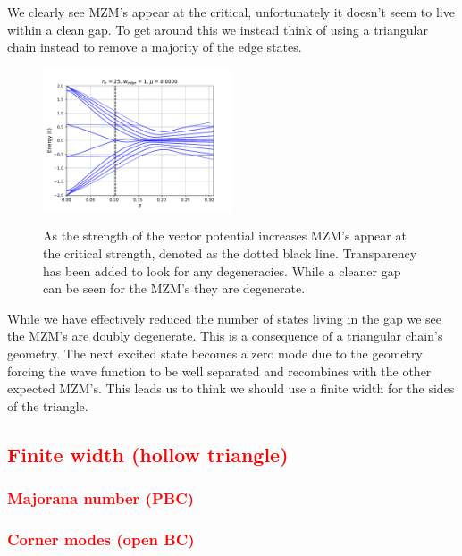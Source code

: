 \documentclass[aps,prb,showpacs,twocolumn,amsmath,amssymb,superscriptaddress]{revtex4-2}
\newcommand{\Red}[1]{\textcolor{red}{#1}}
\begin{document}
We clearly see MZM's appear at the critical, unfortunately it doesn't seem to live within a clean gap.
To get around this we instead think of using a triangular chain instead to remove a majority of the edge states.

\begin{figure}[h]
\includegraphics[width=0.5\textwidth]{./figures/nr-25-w-1-spectral-flow.pdf}
\label{fig: chain-triangle-spectral}
\caption{As the strength of the vector potential increases MZM's appear at the critical strength, denoted as the dotted black line. Transparency has been added to look for any degeneracies. While a cleaner gap can be seen for the MZM's they are degenerate.}
\end{figure}
While we have effectively reduced the number of states living in the gap we see the MZM's are doubly degenerate.
This is a consequence of a triangular chain's geometry.
The next excited state becomes a zero mode due to the geometry forcing the wave function to be well separated and recombines with the other expected MZM's.
This leads us to think we should use a finite width for the sides of the triangle.

\subsection{\Red{Finite width (hollow triangle)}}

\subsubsection{\Red{Majorana number (PBC)}}

\subsubsection{\Red{Corner modes (open BC)}}
\end{document}
